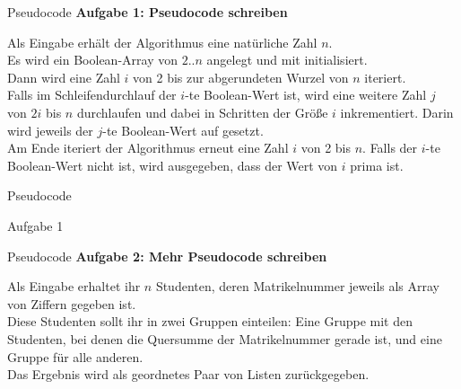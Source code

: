 \begin{frame}{Pseudocode}
	\textbf{Aufgabe 1: Pseudocode schreiben} \\
	\medskip

	Als Eingabe erhält der Algorithmus eine natürliche Zahl $n$.\\
	Es wird ein  Boolean-Array von $2..n$ angelegt und mit \KwFalse initialisiert.\\
	\smallskip
	Dann wird eine Zahl $i$ von 2 bis zur abgerundeten Wurzel von $n$ iteriert.\\
	Falls im Schleifendurchlauf der $i$-te Boolean-Wert \KwFalse ist, wird eine weitere Zahl $j$ von $2i$ bis $n$ durchlaufen und dabei in Schritten der Größe $i$ inkrementiert. Darin wird jeweils der $j$-te Boolean-Wert auf \KwTrue gesetzt. \\
	\smallskip
	Am Ende iteriert der Algorithmus erneut eine Zahl $i$ von 2 bis $n$. Falls der $i$-te Boolean-Wert nicht \KwTrue ist, wird ausgegeben, dass der Wert von $i$ prima ist.
\end{frame}


\begin{frame}{Pseudocode}
	\begin{exampleblock}{ Aufgabe 1}
		\begin{algorithm}[H]
		\end{algorithm}
	\end{exampleblock}
\end{frame}


\begin{frame}{Pseudocode}
	\textbf{Aufgabe 2: Mehr Pseudocode schreiben} \\
	\medskip

	Als Eingabe erhaltet ihr $n$ Studenten, deren Matrikelnummer jeweils als Array von Ziffern gegeben ist.\\
	Diese Studenten sollt ihr in zwei Gruppen einteilen: Eine Gruppe mit den Studenten, bei denen die  Quersumme der Matrikelnummer gerade ist, und eine Gruppe für alle anderen.\\
	Das Ergebnis wird als geordnetes Paar von Listen zurückgegeben.
\end{frame}

